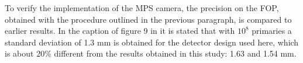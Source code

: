 \documentclass[a4paper,english,12pt]{article}
\begin{document}
To verify the implementation of the MPS camera, the precision on the FOP, obtained with the procedure outlined in the previous paragraph, is compared to earlier results. In the caption of figure 9 in \cite{Pinto2014a} it is stated that with $10^8$ primaries a standard deviation of 1.3 mm is obtained for the detector design used here, which is about 20\% different from the results obtained in this study: 1.63 and 1.54 mm.
\newpage




\end{document}
